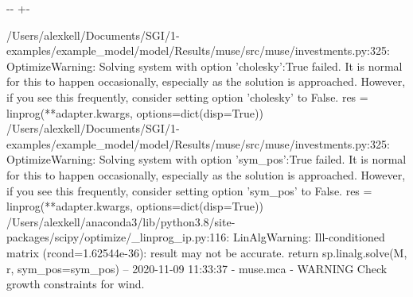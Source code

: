 \documentclass[letterpaper,10pt,english]{sphinxmanual}
\newlength\nbsphinxcodecellspacing
\begin{document}
{

\kern-\sphinxverbatimsmallskipamount\kern-\baselineskip
\kern+\FrameHeightAdjust\kern-\fboxrule
\vspace{\nbsphinxcodecellspacing}

\begin{sphinxVerbatim}[commandchars=\\\{\}]
/Users/alexkell/Documents/SGI/1-examples/example\_model/model/Results/muse/src/muse/investments.py:325: OptimizeWarning: Solving system with option 'cholesky':True failed. It is normal for this to happen occasionally, especially as the solution is approached. However, if you see this frequently, consider setting option 'cholesky' to False.
  res = linprog(**adapter.kwargs, options=dict(disp=True))
/Users/alexkell/Documents/SGI/1-examples/example\_model/model/Results/muse/src/muse/investments.py:325: OptimizeWarning: Solving system with option 'sym\_pos':True failed. It is normal for this to happen occasionally, especially as the solution is approached. However, if you see this frequently, consider setting option 'sym\_pos' to False.
  res = linprog(**adapter.kwargs, options=dict(disp=True))
/Users/alexkell/anaconda3/lib/python3.8/site-packages/scipy/optimize/\_linprog\_ip.py:116: LinAlgWarning: Ill-conditioned matrix (rcond=1.62544e-36): result may not be accurate.
  return sp.linalg.solve(M, r, sym\_pos=sym\_pos)
-- 2020-11-09 11:33:37 - muse.mca - WARNING
Check growth constraints for wind.

\end{sphinxVerbatim}
}
\end{document}

